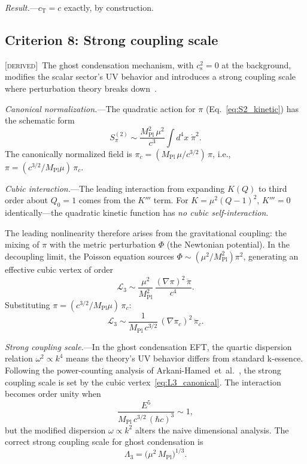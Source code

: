 \documentclass[prd,twocolumn,superscriptaddress,longbibliography,floatfix]{revtex4-2}
\newcommand{\cs}{c_{\mathrm{s}}}
\newcommand{\cT}{c_{\mathrm{T}}}
\newcommand{\MPl}{M_{\mathrm{Pl}}}
\newcommand{\derived}{\textsc{[derived]}}
\begin{document}
\textit{Result.}---$\cT = c$ exactly, by construction.  \checkmark


\subsection{Criterion 8: Strong coupling scale}
\label{sec:strong_coupling}

\derived\ The ghost condensation mechanism, with $\cs^2 = 0$
at the background, modifies the scalar sector's UV behavior
and introduces a strong coupling scale where perturbation
theory breaks down~\cite{AHCLM2004}.

\textit{Canonical normalization.}---The quadratic action for
$\pi$ (Eq.~\eqref{eq:S2_kinetic}) has the schematic form
\begin{equation}
S_\pi^{(2)} \sim \frac{\MPl^2\,\mu^2}{c^3}
\int\!d^4x\;\dot\pi^2.
\label{eq:S2_schematic}
\end{equation}
The canonically normalized field is
$\pi_c = (\MPl\,\mu/c^{3/2})\,\pi$, i.e.,
$\pi = (c^{3/2}/\MPl\mu)\,\pi_c$.

\textit{Cubic interaction.}---The leading interaction from
expanding $K(Q)$ to third order about $Q_0 = 1$ comes from the
$K'''$ term.  For $K = \mu^2(Q-1)^2$, $K''' = 0$ identically---the
quadratic kinetic function has \emph{no cubic self-interaction}.

The leading nonlinearity therefore arises from the gravitational
coupling: the mixing of $\pi$ with the metric perturbation $\Phi$
(the Newtonian potential).  In the decoupling limit, the
Poisson equation sources $\Phi \sim (\mu^2/\MPl^2)\pi^2$,
generating an effective cubic vertex of
order~\cite{AHCLM2004,CrittoHollowood2008}
\begin{equation}
\mathcal{L}_3 \sim \frac{\mu^2}{\MPl^2}\,
\frac{(\nabla\pi)^2\,\ddot\pi}{c^4}.
\label{eq:L3}
\end{equation}
Substituting $\pi = (c^{3/2}/\MPl\mu)\,\pi_c$:
\begin{equation}
\mathcal{L}_3 \sim \frac{1}{\MPl\,c^{3/2}}\,
(\nabla\pi_c)^2\,\ddot\pi_c.
\label{eq:L3_canonical}
\end{equation}

\textit{Strong coupling scale.}---In the ghost condensation EFT,
the quartic dispersion relation $\omega^2 \propto k^4$ means
the theory's UV behavior differs from standard k-essence.
Following the power-counting analysis of
Arkani-Hamed~et~al.~\cite{AHCLM2004}, the strong coupling
scale is set by the cubic vertex~\eqref{eq:L3_canonical}.
The interaction becomes order unity when
\begin{equation}
\frac{E^5}{\MPl\,c^{3/2}\,(\hbar c)^3} \sim 1,
\end{equation}
but the modified dispersion $\omega \propto k^2$ alters the
naive dimensional analysis.  The correct strong coupling scale
for ghost condensation is~\cite{AHCLM2004}
\begin{equation}
\Lambda_3 = \big(\mu^2\,\MPl\big)^{1/3}.
\label{eq:Lambda3}
\end{equation}
\end{document}
